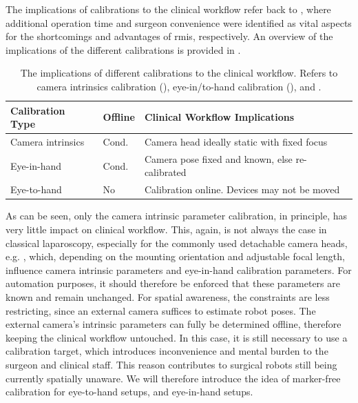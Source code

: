The implications of calibrations to the clinical workflow refer back to , where additional operation time and surgeon convenience were identified as vital aspects for the shortcomings and advantages of \gls{rmis}, respectively. An overview of the implications of the different calibrations is provided in .
\begin{table}[htb]
\centering
\caption{The implications of different calibrations to the clinical workflow. Refers to camera intrinsics calibration (), eye-in/to-hand calibration (), and .}
\label{in:tab:calibrations}
\begin{tabular}{@{}lll@{}}
\toprule
Calibration Type  & Offline       & Clinical Workflow Implications \\ \midrule
Camera intrinsics & Cond.         & Camera head ideally static with fixed focus \\
Eye-in-hand       & Cond. & Camera pose fixed and known, else re-calibrated \\
Eye-to-hand       & No            &  Calibration online. Devices may not be moved \\ \bottomrule
\end{tabular}
\end{table}
As can be seen, only the camera intrinsic parameter calibration, in principle, has very little impact on clinical workflow. This, again, is not always the case in classical laparoscopy, especially for the commonly used detachable camera heads, e.g. , which, depending on the mounting orientation and adjustable focal length, influence camera intrinsic parameters and eye-in-hand calibration parameters. For automation purposes, it should therefore be enforced that these parameters are known and remain unchanged. For spatial awareness, the constraints are less restricting, since an external camera suffices to estimate robot poses. The external camera's intrinsic parameters can fully be determined offline, therefore keeping the clinical workflow untouched. In this case, it is still necessary to use a calibration target, which introduces inconvenience and mental burden to the surgeon and clinical staff. This reason contributes to surgical robots still being currently spatially unaware.
We will therefore introduce the idea of marker-free calibration for eye-to-hand setups, and eye-in-hand setups. %

